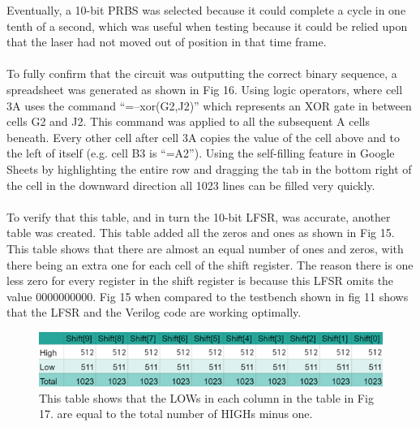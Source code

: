 \documentclass[conference]{IEEEtran}
\begin{document}
Eventually, a 10-bit PRBS was selected because it could complete a cycle in one tenth of a second, which was useful when testing because it could be relied upon that the laser had not moved out of position in that time frame. 
\\\\
To fully confirm that the circuit was outputting the correct binary sequence, a spreadsheet was generated as shown in Fig 16. Using logic operators, where cell 3A uses the command “=--xor(G2,J2)” which represents an XOR gate in between cells G2 and J2. This command was applied to all the subsequent A cells beneath. Every other cell after cell 3A copies the value of the cell above and to the left of itself (e.g. cell B3 is “=A2”). Using the self-filling feature in Google Sheets by highlighting the entire row and dragging the tab in the bottom right of the cell in the downward direction all 1023 lines can be filled very quickly. 
\\\\
To verify that this table, and in turn the 10-bit LFSR, was accurate, another table was created. This table added all the zeros and ones as shown in Fig 15. This table shows that there are almost an equal number of ones and zeros, with there being an extra one for each cell of the shift register. The reason there is one less zero for every register in the shift register is because this LFSR omits the value 0000000000. Fig 15 when compared to the testbench shown in fig 11 shows that the LFSR and the Verilog code are working optimally. 

\begin{figure}[h]
\includegraphics[width=\linewidth]{table 2.png}\par
\caption{This table shows that the LOWs in each column in the table in Fig 17. are equal to the total number of HIGHs minus one.}
\label{fig}
\end{figure}
\end{document}
